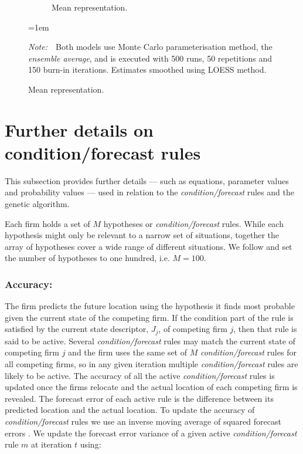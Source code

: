 \documentclass[preprint, 12pt]{elsarticle}
\newcommand{\Figtext}[1]{%
	\begin{tablenotes}[para,flushleft]
		\hangindent=1em
		\footnotesize
		\raggedright
		#1
	\end{tablenotes}
}
\newcommand{\Fignote}[1]{\Figtext{\emph{Note:~}~#1}}
\begin{document}
\begin{figure}[ht!]
\begin{subfigure}[t]{0.315\textwidth}
		\caption{Mean representation.}
		\label{fig:asys_representation_maxcovrnd}
	\end{subfigure}

	\label{fig:asys_maxcovrnd}
	\Fignote{Both models use Monte Carlo parameterisation method, the \emph{ensemble average}, and is executed with 500 runs, 50 repetitions and 150 burn-in iterations. Estimates smoothed using LOESS method.}
\end{figure}

\section{Further details on condition/forecast rules}
\label{app:details}

This subsection provides further details — such as equations, parameter values and probability values — used in relation to the \emph{condition/forecast} rules and the genetic algorithm.

Each firm holds a set of $M$ hypotheses or \emph{condition/forecast} rules. While each hypothesis might only be relevant to a narrow set of situations, together the array of hypotheses cover a wide range of different situations. We follow \citet[chapter~3]{Arthur_2014} and set the number of hypotheses to one hundred, i.e. $M=100$.

\subsubsection*{Accuracy:}

The firm predicts the future location using the hypothesis it finds most probable given the current state of the competing firm. If the condition part of the rule is satisfied by the current state descriptor, $J_j$, of competing firm $j$, then that rule is said to be active. Several \emph{condition/forecast} rules may match the current state of competing firm $j$ and the firm uses the same set of $M$ \emph{condition/forecast} rules for all competing firms, so in any given iteration multiple \emph{condition/forecast} rules are likely to be active. The accuracy of all the active \emph{condition/forecast} rules is updated once the firms relocate and the actual location of each competing firm is revealed. The forecast error of each active rule is the difference between its predicted location and the actual location. To update the accuracy of \emph{condition/forecast} rules we use an inverse moving average of squared forecast errors \citep[chapter~3]{Arthur_2014}. We update the forecast error variance of a given active \emph{condition/forecast} rule $m$ at iteration $t$ using:
\end{document}
